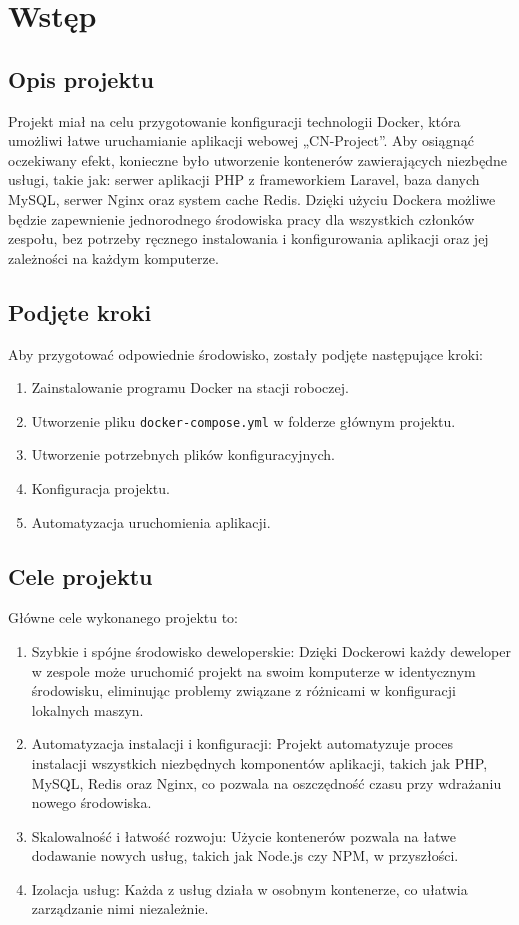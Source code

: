 \chapter{Wstęp}

\section{Opis projektu} 
Projekt miał na celu przygotowanie konfiguracji technologii Docker, która umożliwi łatwe uruchamianie aplikacji webowej „CN-Project”. Aby osiągnąć oczekiwany efekt, konieczne było utworzenie kontenerów zawierających niezbędne usługi, takie jak: serwer aplikacji PHP z frameworkiem Laravel, baza danych MySQL, serwer Nginx oraz system cache Redis. Dzięki użyciu Dockera możliwe będzie zapewnienie jednorodnego środowiska pracy dla wszystkich członków zespołu, bez potrzeby ręcznego instalowania i konfigurowania aplikacji oraz jej zależności na każdym komputerze.

\section{Podjęte kroki} 
Aby przygotować odpowiednie środowisko, zostały podjęte następujące kroki: 
\begin{enumerate} 
    \item Zainstalowanie programu Docker na stacji roboczej. 
    \item Utworzenie pliku \verb|docker-compose.yml| w folderze głównym projektu. 
    \item Utworzenie potrzebnych plików konfiguracyjnych. 
    \item Konfiguracja projektu. 
    \item Automatyzacja uruchomienia aplikacji. 
\end{enumerate}

\section{Cele projektu}
Główne cele wykonanego projektu to: 
\begin{enumerate} 
    \item Szybkie i spójne środowisko deweloperskie: Dzięki Dockerowi każdy deweloper w zespole może uruchomić projekt na swoim komputerze w identycznym środowisku, eliminując problemy związane z różnicami w konfiguracji lokalnych maszyn. 
    \item Automatyzacja instalacji i konfiguracji: Projekt automatyzuje proces instalacji wszystkich niezbędnych komponentów aplikacji, takich jak PHP, MySQL, Redis oraz Nginx, co pozwala na oszczędność czasu przy wdrażaniu nowego środowiska. 
    \item Skalowalność i łatwość rozwoju: Użycie kontenerów pozwala na łatwe dodawanie nowych usług, takich jak Node.js czy NPM, w przyszłości. 
    \item Izolacja usług: Każda z usług działa w osobnym kontenerze, co ułatwia zarządzanie nimi niezależnie. 
\end{enumerate}